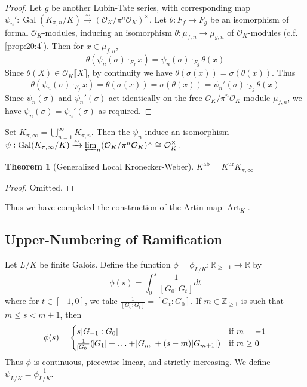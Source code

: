 \documentclass[11pt]{article}
\theoremstyle{definition}
\theoremstyle{plain}
\newtheorem{theorem}[definition]{Theorem}
\theoremstyle{remark}
\DeclareMathOperator{\Gal}{Gal}
\DeclareMathOperator{\Art}{Art}
\newcommand{\ZZ}{\mathbb{Z}}
\newcommand{\RR}{\mathbb{R}}
\newcommand{\cO}{\mathcal{O}}
\newcommand{\ab}{\mathrm{ab}}
\newcommand{\ur}{\mathrm{ur}}
\begin{document}
\begin{proof}
    Let $g$ be another Lubin-Tate series, with corresponding map $\psi_n' : \Gal(K_{\pi,n}/K) \xrightarrow{\sim} (\cO_K / \pi^n \cO_K)^\times$. Let $\theta : F_f \to F_g$ be an isomorphism of formal $\cO_K$-modules, inducing an isomorphism $\theta : \mu_{f,n} \to \mu_{g,n}$ of $\cO_K$-modules (c.f. \autoref{prop:20:4}). Then for $x \in \mu_{f,n}$,
    \begin{equation*}
        \theta(\psi_n(\sigma) \cdot_{F_f} x) = \psi_n(\sigma) \cdot_{F_g} \theta(x)
    \end{equation*}
    Since $\theta(X) \in \cO_K \llbracket X \rrbracket$, by continuity we have $\theta(\sigma(x)) = \sigma(\theta(x))$. Thus
    \begin{equation*}
        \theta(\psi_n(\sigma) \cdot_{F_f} x) = \theta(\sigma(x)) = \sigma(\theta(x)) = \psi_n'(\sigma) \cdot_{F_g} \theta(x)
    \end{equation*}
    Since $\psi_n(\sigma)$ and $\psi_n'(\sigma)$ act identically on the free $\cO_K / \pi^n \cO_K$-module $\mu_{f,n}$, we have $\psi_n(\sigma) = \psi_n'(\sigma)$ as required.
\end{proof}

Set $K_{\pi, \infty} = \bigcup_{n=1}^\infty K_{\pi,n}$. Then the $\psi_n$ induce an isomorphism $\psi : \Gal(K_{\pi,\infty}/K) \xrightarrow{\sim} \varprojlim_n (\cO_K / \pi^n \cO_K)^\times \cong \cO_K^\times$.

\begin{theorem}[Generalized Local Kronecker-Weber]\label{thm:20_8}
    $K^\ab = K^\ur K_{\pi, \infty}$
\end{theorem}
\begin{proof}
    Omitted.
\end{proof}

\noindent Thus we have completed the construction of the Artin map $\Art_K$.

\subsection{Upper-Numbering of Ramification}

Let $L/K$ be finite Galois. Define the function $\phi = \phi_{L/K} : \RR_{\ge -1} \to \RR$ by
\begin{equation*}
    \phi(s) = \int_0^s \frac{1}{[G_0 : G_t]} dt
\end{equation*}
where for $t \in [-1, 0]$, we take $\frac{1}{[G_0 : G_t]} = [G_t : G_0]$. If $m \in \ZZ_{\ge 1}$ is such that $m \le s < m + 1$, then
\begin{equation*}
    \phi(s) =
    \begin{cases}
        s [G_{-1} : G_0] & \text{if } m = -1\\
        \frac{1}{\abs{G_0}} (\abs{G_1} + \ldots + \abs{G_m} + (s - m) \abs{G_{m+1}}) & \text{if } m \ge 0\\
    \end{cases}
\end{equation*}
Thus $\phi$ is continuous, piecewise linear, and strictly increasing. We define $\psi_{L/K} = \phi_{L/K}^{-1}$.
\end{document}
